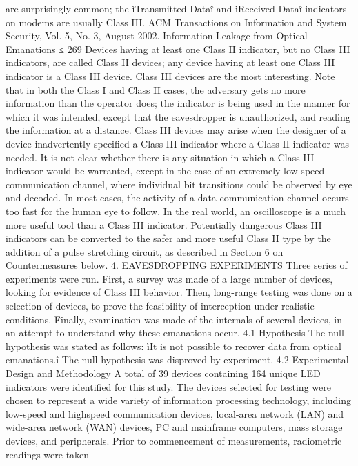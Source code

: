 are surprisingly common; the ìTransmitted Dataî and ìReceived 
Dataî indicators on modems are usually Class III. 
ACM Transactions on Information and System Security, Vol. 5, No. 3, August 2002.
Information Leakage from Optical Emanations ≤ 269 
Devices having at least one Class II indicator, but no Class III indicators, are 
called Class II devices; any device having at least one Class III indicator is a 
Class III device. Class III devices are the most interesting. 
Note that in both the Class I and Class II cases, the adversary gets no more 
information than the operator does; the indicator is being used in the manner 
for which it was intended, except that the eavesdropper is unauthorized, and 
reading the information at a distance. 
Class III devices may arise when the designer of a device inadvertently specified 
a Class III indicator where a Class II indicator was needed. It is not clear 
whether there is any situation in which a Class III indicator would be warranted, 
except in the case of an extremely low-speed communication channel, 
where individual bit transitions could be observed by eye and decoded. In most 
cases, the activity of a data communication channel occurs too fast for the human 
eye to follow. In the real world, an oscilloscope is a much more useful tool 
than a Class III indicator. 
Potentially dangerous Class III indicators can be converted to the safer and 
more useful Class II type by the addition of a pulse stretching circuit, as described 
in Section 6 on Countermeasures below. 
4. EAVESDROPPING EXPERIMENTS 
Three series of experiments were run. First, a survey was made of a large 
number of devices, looking for evidence of Class III behavior. Then, long-range 
testing was done on a selection of devices, to prove the feasibility of interception 
under realistic conditions. Finally, examination was made of the internals 
of several devices, in an attempt to understand why these emanations 
occur. 
4.1 Hypothesis 
The null hypothesis was stated as follows: ìIt is not possible to recover data 
from optical emanations.î The null hypothesis was disproved by experiment. 
4.2 Experimental Design and Methodology 
A total of 39 devices containing 164 unique LED indicators were identified for 
this study. The devices selected for testing were chosen to represent a wide 
variety of information processing technology, including low-speed and highspeed 
communication devices, local-area network (LAN) and wide-area network 
(WAN) devices, PC and mainframe computers, mass storage devices, and 
peripherals. 
Prior to commencement of measurements, radiometric readings were taken 
